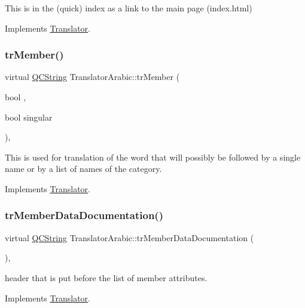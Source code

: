 This is in the (quick) index as a link to the main page (index.\+html) 

Implements \mbox{\hyperlink{class_translator}{Translator}}.

\mbox{\label{class_translator_arabic_a079b9fecf2ac416addd85d6498290628}} 
\subsubsection{\texorpdfstring{trMember()}{trMember()}}
{\footnotesize\ttfamily virtual \mbox{\hyperlink{class_q_c_string}{Q\+C\+String}} Translator\+Arabic\+::tr\+Member (\begin{DoxyParamCaption}\item[{bool}]{,  }\item[{bool}]{singular }\end{DoxyParamCaption})\hspace{0.3cm}{\ttfamily [inline]}, {\ttfamily [virtual]}}

This is used for translation of the word that will possibly be followed by a single name or by a list of names of the category. 

Implements \mbox{\hyperlink{class_translator}{Translator}}.

\mbox{\label{class_translator_arabic_a491835dea89d627a116a1566f09f8efa}} 
\subsubsection{\texorpdfstring{trMemberDataDocumentation()}{trMemberDataDocumentation()}}
{\footnotesize\ttfamily virtual \mbox{\hyperlink{class_q_c_string}{Q\+C\+String}} Translator\+Arabic\+::tr\+Member\+Data\+Documentation (\begin{DoxyParamCaption}{ }\end{DoxyParamCaption})\hspace{0.3cm}{\ttfamily [inline]}, {\ttfamily [virtual]}}

header that is put before the list of member attributes. 

Implements \mbox{\hyperlink{class_translator}{Translator}}.

